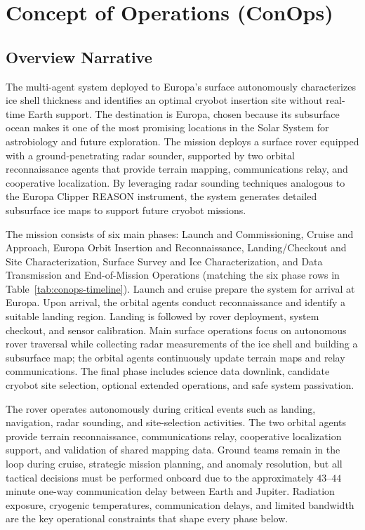 \documentclass[11pt]{article}
\begin{document}
\section{Concept of Operations (ConOps)}

\subsection{Overview Narrative}

The multi-agent system deployed to Europa's surface autonomously characterizes ice shell
thickness and identifies an optimal cryobot insertion site without real-time Earth support. The
destination is Europa, chosen because its subsurface ocean makes it one of the most promising
locations in the Solar System for astrobiology and future exploration. The mission deploys a
surface rover equipped with a ground-penetrating radar sounder, supported by two orbital
reconnaissance agents that provide terrain mapping, communications relay, and cooperative
localization. By leveraging radar sounding techniques analogous to the Europa Clipper REASON
instrument, the system generates detailed subsurface ice maps to support future cryobot missions.

The mission consists of six main phases: Launch and Commissioning, Cruise and Approach, Europa
Orbit Insertion and Reconnaissance, Landing/Checkout and Site Characterization, Surface Survey
and Ice Characterization, and Data Transmission and End-of-Mission Operations (matching the six
phase rows in Table~\ref{tab:conops-timeline}). Launch and cruise prepare the
system for arrival at Europa. Upon arrival, the orbital agents conduct reconnaissance and
identify a suitable landing region. Landing is followed by rover deployment, system checkout, and
sensor calibration. Main surface operations focus on autonomous rover traversal while collecting
radar measurements of the ice shell and building a subsurface map; the orbital agents
continuously update terrain maps and relay communications. The final phase includes science data
downlink, candidate cryobot site selection, optional extended operations, and safe system
passivation.

The rover operates autonomously during critical events such as landing, navigation, radar
sounding, and site-selection activities. The two orbital agents provide terrain reconnaissance,
communications relay, cooperative localization support, and validation of shared mapping data.
Ground teams remain in the loop during cruise, strategic mission planning, and anomaly
resolution, but all tactical decisions must be performed onboard due to the approximately
$43$--$44$ minute one-way communication delay between Earth and Jupiter. Radiation exposure,
cryogenic temperatures, communication delays, and limited bandwidth are the key operational
constraints that shape every phase below.
\end{document}
